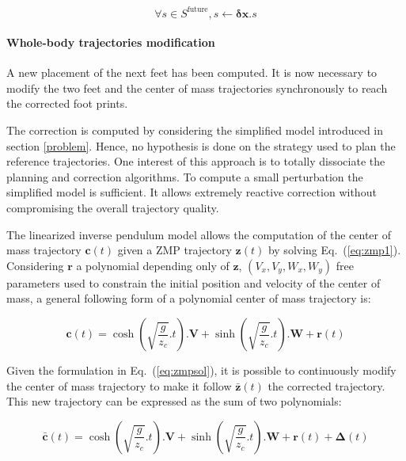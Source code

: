 \begin{equation} \label{eq:footstepmodif}
  \forall s \in S^{\text{future}}, s \gets \mathbf{\delta {x}} . s
\end{equation}


\vspace{0.3cm}
\paragraph{Whole-body trajectories modification}

A new placement of the next feet has been computed. It is now necessary
to modify the two feet and the center of mass trajectories
synchronously to reach the corrected foot prints.

The correction is computed by considering the simplified model
introduced in section \ref{problem}. Hence, no hypothesis is done on
the strategy used to plan the reference trajectories. One interest of
this approach is to totally dissociate the planning and correction
algorithms. To compute a small perturbation the simplified model is
sufficient. It allows extremely reactive correction without
compromising the overall trajectory quality.


The linearized inverse pendulum model allows the computation of the
center of mass trajectory $\mathbf{c}(t)$ given a ZMP trajectory
$\mathbf{z}(t)$ by solving Eq.~(\ref{eq:zmp1}). Considering $\mathbf{r}$ a
polynomial depending only of $\mathbf{z}$, $(V_x, V_y, W_x, W_y)$ free
parameters used to constrain the initial position and velocity of the
center of mass, a general following form of a polynomial center of
mass trajectory is:

\begin{equation} \label{eq:zmpsol}
  \mathbf{c}(t) = \cosh(\sqrt{\frac{g}{z_c}}.t) . \mathbf{V} + \sinh(\sqrt{\frac{g}{z_c}}.t) . \mathbf{W} + \mathbf{r}(t)
\end{equation}

Given the formulation in Eq.~(\ref{eq:zmpsol}), it is possible to
continuously modify the center of mass trajectory to make it follow
\mbox{$\bar{\mathbf{z}}(t)$} the corrected trajectory. This new
trajectory can be expressed as the sum of two polynomials:

\begin{equation} \label{eq:zmpsolcor}
  \bar{\mathbf{c}}(t) = \cosh(\sqrt{\frac{g}{z_c}}.t) . \mathbf{V} +
  \sinh(\sqrt{\frac{g}{z_c}}.t) . \mathbf{W} + \mathbf{r}(t) + \mathbf{\Delta}(t)
\end{equation}

